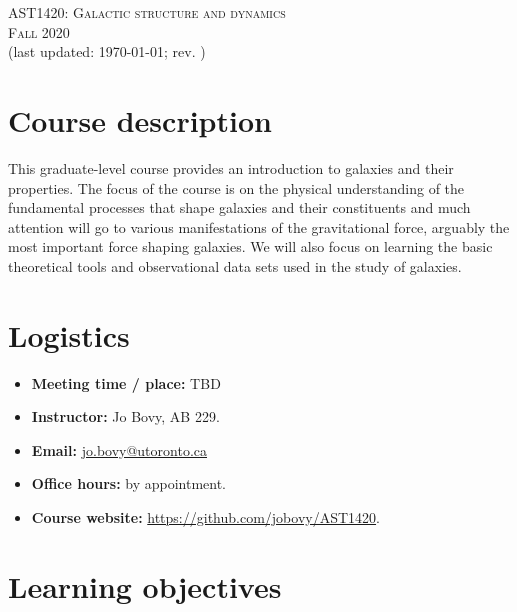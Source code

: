 \documentclass{article}
\begin{document}
\begin{center}
  \LARGE{\scshape{AST1420: Galactic structure and dynamics}}\\[5pt]
  \Large{\scshape{Fall 2020}}\\[5pt]
  \large{(last updated: \today; rev. \githash)}\\[25pt]
\end{center}

\section*{Course description}

This graduate-level course provides an introduction to galaxies and
their properties. The focus of the course is on the physical
understanding of the fundamental processes that shape galaxies and
their constituents and much attention will go to various
manifestations of the gravitational force, arguably the most important
force shaping galaxies. We will also focus on learning the basic
theoretical tools and observational data sets used in the study of
galaxies.

\section*{Logistics}

\begin{itemize}

  \item {\bf Meeting time / place:} TBD%

  \item {\bf Instructor:} Jo Bovy, AB 229.

  \item {\bf Email:} \href{mailto:jo.bovy@utoronto.ca}{jo.bovy@utoronto.ca}

  \item {\bf Office hours:} by appointment.

  \item {\bf Course website:} \url{https://github.com/jobovy/AST1420}.

\end{itemize}

\section*{Learning objectives}
\end{document}
